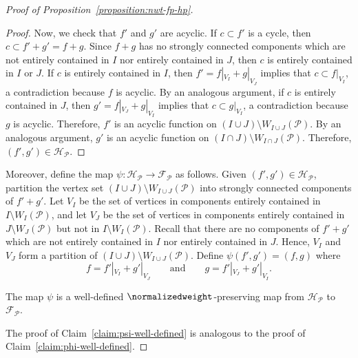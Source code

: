 \begin{proof}[Proof of Proposition~\ref{proposition:nwt-fp-hp}]
\begin{proof}
Now, we check that \(f'\) and \(g'\) are acyclic.
If \(c \subset f'\) is a cycle, then \(c \subset f' + g' = f + g\).
Since \(f+g\) has no strongly connected components which are not entirely contained in \(I\) nor entirely contained in \(J\), then \(c\) is entirely contained in \(I\) or \(J\).
If \(c\) is entirely contained in \(I\), then \(f' = f|_{V_I} + g|_{V_J}\) implies that \(c \subset f|_{V_I}\), a contradiction because \(f\) is acyclic.
By an analogous argument, if \(c\) is entirely contained in \(J\), then \(g' = f|_{V_J} + g|_{V_I}\) implies that \(c \subset g|_{V_I}\), a contradiction because \(g\) is acyclic.
Therefore, \(f'\) is an acyclic function on \((I \cup J) \setminus W_{I \cup J}(\mathcal{P})\).
By an analogous argument, \(g'\) is an acyclic function on \((I \cap J) \setminus W_{I \cap J}(\mathcal{P})\).
Therefore, \((f', g') \in \mathcal{H}_{\mathcal{P}}\).
\end{proof}

Moreover, define the map \(\psi \colon \mathcal{H}_{\mathcal{P}} \to \mathcal{F}_{\mathcal{P}}\) as follows.
Given \((f', g') \in \mathcal{H}_{\mathcal{P}}\),
partition the vertex set \((I \cup J) \setminus W_{I \cup J}(\mathcal{P})\) into strongly connected components of \(f'+g'\).
Let \(V_I\) be the set of vertices in components entirely contained in \(I \setminus W_I(\mathcal{P})\),
and let \(V_J\) be the set of vertices in components entirely contained in \(J \setminus W_J(\mathcal{P})\) but not in \(I \setminus W_I(\mathcal{P})\).
Recall that there are no components of \(f'+g'\) which are not entirely contained in \(I\) nor entirely contained in \(J\).
Hence, \(V_I\) and \(V_J\) form a partition of \((I \cup J) \setminus W_{I \cup J}(\mathcal{P})\).
Define \(\psi(f', g') = (f, g)\) where
\begin{equation*}
    f = f'|_{V_I} + g'|_{V_J} \qquad \text{and} \qquad g = f'|_{V_J} + g'|_{V_I}.
\end{equation*}

\begin{claim} \label{claim:psi-well-defined}
    The map \(\psi\) is a well-defined \(\normalizedweight\)-preserving map from \(\mathcal{H}_{\mathcal{P}}\) to \(\mathcal{F}_{\mathcal{P}}\).
\end{claim}

The proof of Claim~\ref{claim:psi-well-defined} is analogous to the proof of Claim~\ref{claim:phi-well-defined}.


\end{proof}
